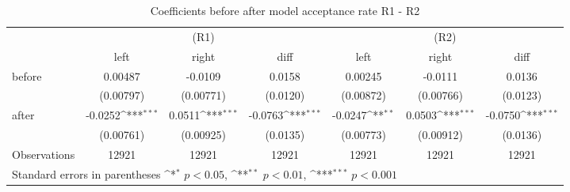 \begin{table}[!ht]\centering \footnotesize
\def\sym#1{\ifmmode^{#1}\else\(^{#1}\)\fi}
\caption{Coefficients before after model acceptance rate R1 - R2}
\begin{tabular}{l*{6}{c}}
\hline\hline
                    &\multicolumn{3}{c}{(R1)}&\multicolumn{3}{c}{(R2)}\\
&\multicolumn{1}{c}{left}&\multicolumn{1}{c}{right}&\multicolumn{1}{c}{diff}&\multicolumn{1}{c}{left}&\multicolumn{1}{c}{right}&\multicolumn{1}{c}{diff}\\
\hline
before              &     0.00487         &     -0.0109         &      0.0158         &     0.00245         &     -0.0111         &      0.0136         \\
                    &   (0.00797)         &   (0.00771)         &    (0.0120)         &   (0.00872)         &   (0.00766)         &    (0.0123)         \\
[0,5em]
after               &     -0.0252\sym{***}&      0.0511\sym{***}&     -0.0763\sym{***}&     -0.0247\sym{**} &      0.0503\sym{***}&     -0.0750\sym{***}\\
                    &   (0.00761)         &   (0.00925)         &    (0.0135)         &   (0.00773)         &   (0.00912)         &    (0.0136)         \\
\hline
Observations        &       12921         &       12921         &       12921         &       12921         &       12921         &       12921         \\
\hline\hline
\multicolumn{7}{l}{\footnotesize Standard errors in parentheses \sym{*} \(p<0.05\), \sym{**} \(p<0.01\), \sym{***} \(p<0.001\)}\\
\end{tabular}
\end{table}
